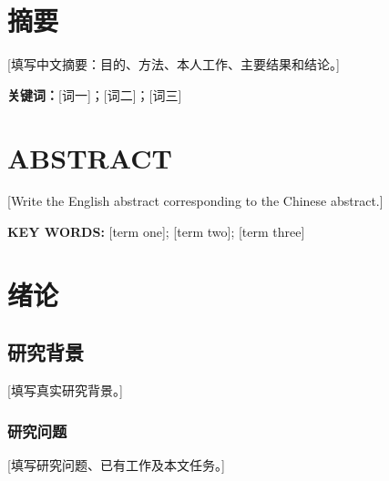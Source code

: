 \documentclass[UTF8,zihao=-4,twoside,openany,fontset=windows]{ctexbook}
\begin{document}
\chapter*{摘\quad 要}
[填写中文摘要：目的、方法、本人工作、主要结果和结论。]

\par\noindent\textbf{关\quad 键\quad 词：}[词一]；[词二]；[词三]

\clearpage
\chapter*{ABSTRACT}
[Write the English abstract corresponding to the Chinese abstract.]

\par\noindent\textbf{KEY WORDS:} [term one]; [term two]; [term three]


\cleardoublepage
\tableofcontents

\cleardoublepage
{}
\chapter{绪论}
\section{研究背景}
[填写真实研究背景。]
\subsection{研究问题}
[填写研究问题、已有工作及本文任务。]

%
\end{document}
